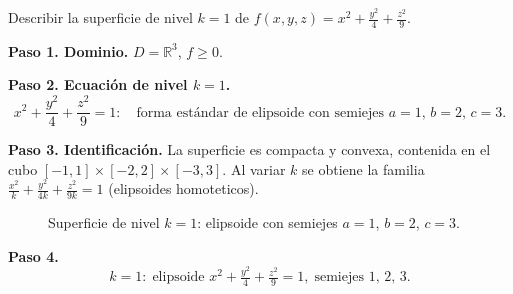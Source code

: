 \begin{example}
Describir la superficie de nivel $k=1$ de
$\displaystyle f(x,y,z)=x^2+\frac{y^2}{4}+\frac{z^2}{9}$.
\begin{myproof}
\textbf{Paso 1. Dominio.} $D=\mathbb{R}^3$, $f\ge 0$.

\textbf{Paso 2. Ecuación de nivel $k=1$.}
\[
x^2+\frac{y^2}{4}+\frac{z^2}{9}=1:
\quad\text{forma estándar de elipsoide con semiejes }a=1,\,b=2,\,c=3.
\]

\textbf{Paso 3. Identificación.} La superficie es compacta y convexa,
contenida en el cubo $[-1,1]\times[-2,2]\times[-3,3]$. Al variar $k$
se obtiene la familia $\tfrac{x^2}{k}+\tfrac{y^2}{4k}+\tfrac{z^2}{9k}=1$
(elipsoides homoteticos).

\begin{figure}[H]
\centering
{}
\caption{Superficie de nivel $k=1$: elipsoide con semiejes $a=1$, $b=2$, $c=3$.}
\label{fig:nivel_elipsoide}
\end{figure}

\textbf{Paso 4.}
\[\boxed{k=1:\;\text{elipsoide }x^2+\tfrac{y^2}{4}+\tfrac{z^2}{9}=1,
\;\text{semiejes }1,\,2,\,3.}\]
\end{myproof}
\end{example}

